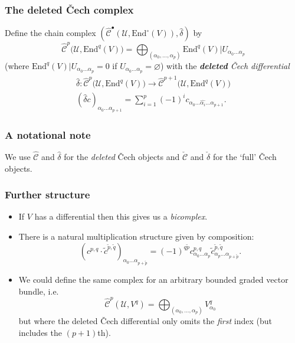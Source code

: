 \documentclass{beamer}
\begin{document}
        \begin{frame}\frametitle{The deleted Čech complex}
            \begin{definition}
                Define the chain complex $(\hat{\mathscr{C}}^\bullet(\mathcal{U},\mathrm{End}^\circ(V)),\hat{\delta})$ by
                \begin{equation*}
                    \hat{\mathscr{C}}^p\big(\mathcal{U},\mathrm{End}^q(V)\big) = \bigoplus_{(\alpha_0,\ldots,\alpha_p)} \mathrm{End}^q(V)|U_{\alpha_0\ldots\alpha_p}
                \end{equation*}
                (where $\mathrm{End}^q(V)|U_{\alpha_0\ldots\alpha_p}=0$ if $U_{\alpha_0\ldots\alpha_p}=\varnothing$) with the \emph{\textbf{deleted} Čech differential}
                \begin{gather*}
                    \hat{\delta} \colon \hat{\mathscr{C}}^p\big(\mathcal{U},\mathrm{End}^q(V)\big) \to \hat{\mathscr{C}}^{p+1}\big(\mathcal{U},\mathrm{End}^q(V)\big)\\
                    (\hat{\delta}c)_{\alpha_0\ldots\alpha_{p+1}} = \sum_{i=1}^p (-1)^i c_{\alpha_0\ldots\widehat{\alpha_i}\ldots\alpha_{p+1}}.
                \end{gather*}
            \end{definition}
        \end{frame}

        \begin{frame}\frametitle{A notational note}
            We use $\hat{\mathscr{C}}$ and $\hat{\delta}$ for the \emph{deleted} Čech objects and $\check{\mathscr{C}}$ and $\check{\delta}$ for the `full' Čech objects.
        \end{frame}

        \begin{frame}\frametitle{Further structure}
            \begin{itemize}
                \item If $V$ has a differential then this gives us a \emph{bicomplex}.
                \pause
                \item There is a natural multiplication structure given by composition:
                    \begin{equation*}
                        (c^{p,q}\cdot \tilde{c}^{\tilde{p},\tilde{q}})_{\alpha_0\ldots\alpha_{p+\tilde{p}}} = (-1)^{q\tilde{p}} c_{\alpha_0\ldots\alpha_p}^{p,q} \tilde{c}_{\alpha_p\ldots\alpha_{p+\tilde{p}}}^{\tilde{p},\tilde{q}}.
                    \end{equation*}
                \pause
                \item We could define the same complex for an arbitrary bounded graded vector bundle, i.e.
                \begin{equation*}
                    \hat{\mathscr{C}}^p(\mathcal{U},V^q) = \bigoplus_{(\alpha_0,\ldots,\alpha_p)} V_{\alpha_0}^q
                \end{equation*}
                but where the deleted Čech differential only omits the \emph{first} index (but includes the $(p+1)$th).
            \end{itemize}
        \end{frame}
\end{document}
